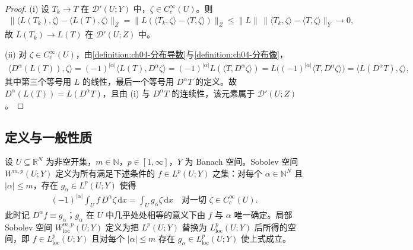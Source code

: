 \documentclass[../../main.tex]{subfiles}%
\begin{document}
\begin{proof}
(i) 设 $T_k\to T$ 在 $\mathcal{D}'(U;Y)$ 中，$\zeta\in C_c^\infty(U)$。则
\begin{align*}
\|\langle L(T_k),\zeta\rangle-\langle L(T),\zeta\rangle\|_Z=\|L(\langle T_k,\zeta\rangle-\langle T,\zeta\rangle)\|_Z\leqslant\|L\|\,\|\langle T_k,\zeta\rangle-\langle T,\zeta\rangle\|_Y\to0 ,
\end{align*}
故 $L(T_k)\to L(T)$ 在 $\mathcal{D}'(U;Z)$ 中。

(ii) 对 $\zeta\in C_c^\infty(U)$，由\cref{definition:ch04-分布导数}与\cref{definition:ch04-分布像}，
\begin{align*}
\langle D^\alpha(L(T)),\zeta\rangle=(-1)^{|\alpha|}\langle L(T),D^\alpha\zeta\rangle=(-1)^{|\alpha|}L(\langle T,D^\alpha\zeta\rangle)=L\big((-1)^{|\alpha|}\langle T,D^\alpha\zeta\rangle\big)=\langle L(D^\alpha T),\zeta\rangle ,
\end{align*}
其中第三个等号用 $L$ 的线性，最后一个等号用 $D^\alpha T$ 的定义。故 $D^\alpha(L(T))=L(D^\alpha T)$，且由 (i) 与 $D^\alpha T$ 的连续性，该元素属于 $\mathcal{D}'(U;Z)$。
\end{proof}

\subsection{定义与一般性质}\label{subsection:ch04-向量Sobolev定义}

\begin{definition}[向量 Sobolev 空间]\label{definition:ch04-向量Sobolev}
设 $U\subseteq\mathbb{R}^N$ 为非空开集，$m\in\mathbb{N}$，$p\in[1,\infty]$，$Y$ 为 Banach 空间。Sobolev 空间 $W^{m,p}(U;Y)$ 定义为所有满足下述条件的 $f\in L^p(U;Y)$ 之集：对每个 $\alpha\in\mathbb{N}^N$ 且 $|\alpha|\leqslant m$，存在 $g_\alpha\in L^p(U;Y)$ 使得
\begin{align*}
(-1)^{|\alpha|}\int_Uf\,D^\alpha\zeta\,\mathrm{d}x=\int_Ug_\alpha\zeta\,\mathrm{d}x\quad\text{对一切 }\zeta\in C_c^\infty(U).
\end{align*}
此时记 $D^\alpha f\equiv g_\alpha$；$g_\alpha$ 在 $U$ 中几乎处处相等的意义下由 $f$ 与 $\alpha$ 唯一确定。局部 Sobolev 空间 $W^{m,p}_{\mathrm{loc}}(U;Y)$ 定义为把 $L^p(U;Y)$ 替换为 $L^p_{\mathrm{loc}}(U;Y)$ 后所得的空间，即 $f\in L^p_{\mathrm{loc}}(U;Y)$ 且对每个 $|\alpha|\leqslant m$ 存在 $g_\alpha\in L^p_{\mathrm{loc}}(U;Y)$ 使上式成立。
\end{definition}
\end{document}
